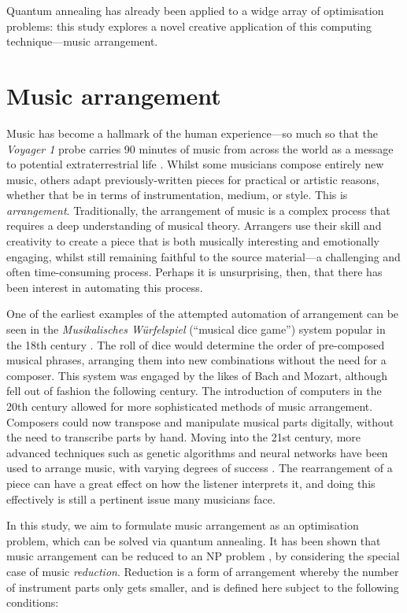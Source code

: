 \documentclass[12pt]{article}
\theoremstyle{definition}
\begin{document}
Quantum annealing has already been applied to a widge array of optimisation problems: this study explores a novel creative application of this computing technique---music arrangement.


\section{Music arrangement}
\label{sec:arrangement}

Music has become a hallmark of the human experience---so much so that the \textit{Voyager 1} probe carries 90 minutes of music from across the world as a message to potential extraterrestrial life \cite{nasa_golden_2024}. Whilst some musicians compose entirely new music, others adapt previously-written pieces for practical or artistic reasons, whether that be in terms of instrumentation, medium, or style. This is \emph{arrangement}.
Traditionally, the arrangement of music is a complex process that requires a deep understanding of musical theory. Arrangers use their skill and creativity to create a piece that is both musically interesting and emotionally engaging, whilst still remaining faithful to the source material---a challenging and often time-consuming process. Perhaps it is unsurprising, then, that there has been interest in automating this process.

One of the earliest examples of the attempted automation of arrangement can be seen in the \textit{Musikalisches Würfelspiel} (``musical dice game'') system popular in the 18th century \cite{nierhaus_algorithmic_2009}. The roll of dice would determine the order of pre-composed musical phrases, arranging them into new combinations without the need for a composer. This system was engaged by the likes of Bach and Mozart, although fell out of fashion the following century.
The introduction of computers in the 20th century allowed for more sophisticated methods of music arrangement. Composers could now transpose and manipulate musical parts digitally, without the need to transcribe parts by hand. Moving into the 21st century, more advanced techniques such as genetic algorithms and neural networks have been used to arrange music, with varying degrees of success \cite{nierhaus_algorithmic_2009}. The rearrangement of a piece can have a great effect on how the listener interprets it, and doing this effectively is still a pertinent issue many musicians face. 

In this study, we aim to formulate music arrangement as an optimisation problem, which can be solved via quantum annealing. It has been shown that music arrangement can be reduced to an NP problem \cite{moses_computational_2016}, by considering the special case of music \emph{reduction}. Reduction is a form of arrangement whereby the number of instrument parts only gets smaller, and is defined here subject to the following conditions:
\end{document}
